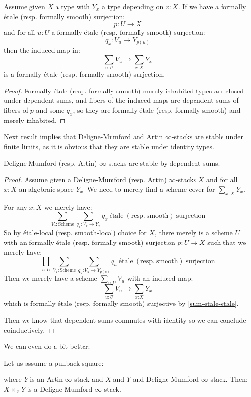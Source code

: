 \begin{lemma}\label{sum-etale-etale}
Assume given $X$ a type with $Y_x$ a type depending on $x:X$. If we have a formally étale (resp. formally smooth) surjection:
\[p:U\to X\]
and for all $u:U$ a formally étale (resp. formally smooth) surjection:
\[q_x : V_u \to Y_{p(u)}\]
then the induced map in:
\[\sum_{u:U} V_u \to \sum_{x:X}Y_x\]
is a formally étale (resp. formally smooth) surjection.
\end{lemma}

\begin{proof}
Formally étale (resp. formally smooth) merely inhabited types are closed under dependent sums, and fibers of the induced maps are dependent sums of fibers of $p$ and some $q_x$, so they are formally étale (resp. formally smooth) and merely inhabited.
\end{proof}

Next result implies that Deligne-Mumford and Artin $\infty$-stacks are stable under finite limits, as it is obvious that they are stable under identity types.

\begin{proposition}\label{infty-stacks-sum}
Deligne-Mumford (resp. Artin) $\infty$-stacks are stable by dependent sums.
\end{proposition}

\begin{proof}
Assume given a Deligne-Mumford (resp. Artin) $\infty$-stacks $X$ and for all $x:X$ an algebraic space $Y_x$. We need to merely find a scheme-cover for $\sum_{x:X} Y_x$. 

For any $x:X$ we merely have:
\[\sum_{V_x:\mathrm{Scheme}} \sum_{q_x: V_x \to Y_x} q_x\ \mathrm{étale\ (resp.\ smooth)\ surjection}\]
So by étale-local (resp. smooth-local) choice for $X$, there merely is a scheme $U$ with an formally étale (resp. formally smooth) surjection $p: U \to X$ such that we merely have:
\[\prod_{u:U} \sum_{V_u:\mathrm{Scheme}} \sum_{q_u: V_u \to Y_{p(u)}} q_u\ \mathrm{étale\ (resp.\ smooth)\ surjection}\]
Then we merely have a scheme $\sum_{u:U}V_u$ with an induced map:
\[\sum_{u:U}V_u \to \sum_{x:X} Y_x\]
which is formally étale (resp. formally smooth) surjective by \cref{sum-etale-etale}.

Then we know that dependent sums commutes with identity so we can conclude coinductively.
\end{proof}

We can even do a bit better:

\begin{lemma}
Let us assume a pullback square:
 \begin{center}
  \end{center}
 where $Y$ is an Artin $\infty$-stack and $X$ and $Y$ and Deligne-Mumford $\infty$-stack. Then:
 $X\times_ZY$ is a Deligne-Mumford $\infty$-stack.
\end{lemma}

